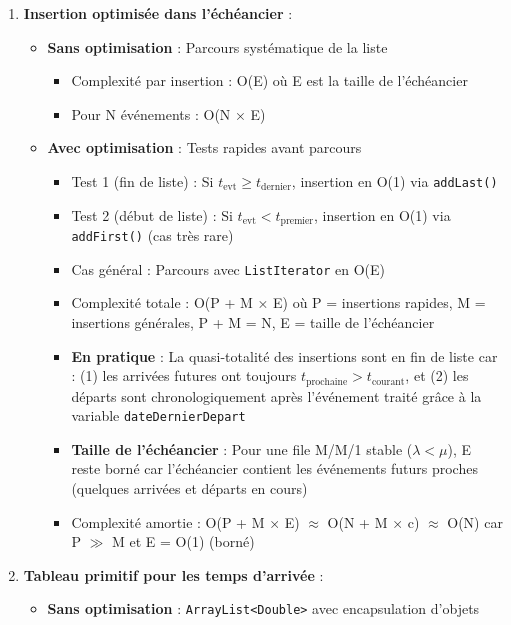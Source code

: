 \documentclass[12pt,a4paper]{article}
\begin{document}
\begin{enumerate}
    \vspace{0.3cm}
    \item \textbf{Insertion optimisée dans l'échéancier} :
    \begin{itemize}
        \item \textbf{Sans optimisation} : Parcours systématique de la liste
        \begin{itemize}
            \item Complexité par insertion : O(E) où E est la taille de l'échéancier
            \item Pour N événements : O(N × E)
        \end{itemize}
        \item \textbf{Avec optimisation} : Tests rapides avant parcours
        \begin{itemize}
            \item Test 1 (fin de liste) : Si $t_{\text{evt}} \geq t_{\text{dernier}}$, insertion en O(1) via \texttt{addLast()}
            \item Test 2 (début de liste) : Si $t_{\text{evt}} < t_{\text{premier}}$, insertion en O(1) via \texttt{addFirst()} (cas très rare)
            \item Cas général : Parcours avec \texttt{ListIterator} en O(E)
            \item Complexité totale : O(P + M × E) où P = insertions rapides, M = insertions générales, P + M = N, E = taille de l'échéancier
            \item \textbf{En pratique} : La quasi-totalité des insertions sont en fin de liste car : (1) les arrivées futures ont toujours $t_{\text{prochaine}} > t_{\text{courant}}$, et (2) les départs sont chronologiquement après l'événement traité grâce à la variable \texttt{dateDernierDepart}
            \item \textbf{Taille de l'échéancier} : Pour une file M/M/1 stable ($\lambda < \mu$), E reste borné car l'échéancier contient les événements futurs proches (quelques arrivées et départs en cours)
            \item Complexité amortie : O(P + M × E) $\approx$ O(N + M × c) $\approx$ O(N) car P $\gg$ M et E = O(1) (borné)
        \end{itemize}
    \end{itemize}
    \newpage
    \item \textbf{Tableau primitif pour les temps d'arrivée} :
    \begin{itemize}
        \item \textbf{Sans optimisation} : \texttt{ArrayList<Double>} avec encapsulation d'objets

\end{itemize}
\end{enumerate}
\end{document}
